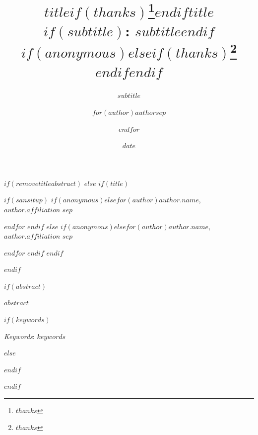 \documentclass[
$if(fontsize)$
  $fontsize$,
$endif$
$if(lang)$
  $babel-lang$,
$endif$
$if(papersize)$
  $papersize$paper,
$endif$
$if(beamer)$
  ignorenonframetext,
$if(handout)$
  handout,
$endif$
$if(aspectratio)$
  aspectratio=$aspectratio$,
$endif$
$endif$
$for(classoption)$
  $classoption$$sep$,
$endfor$
]{$documentclass$}
\title{$title$$if(thanks)$\thanks{$thanks$}$endif$}
\subtitle{$subtitle$}
\author{$for(author)$$author$$sep$ \and $endfor$}
\date{$date$}
\institute{$for(institute)$$institute$$sep$ \and $endfor$}
\title{$title$$if(subtitle)$: $subtitle$$endif$$if(anonymous)$$else$$if(thanks)$\thanks{$thanks$} $endif$$endif$ }
\date{}
\renewenvironment{abstract}
 {{%
    \setlength{\leftmargin}{0mm}
    \setlength{\rightmargin}{\leftmargin}%
  }%
  \relax}
 {\endlist}
\begin{document}


$if(removetitleabstract)$
$else$
$if(title)$

{%
\setlength{\parindent}{0pt}
\thispagestyle{plain}
{%
\maketitle  %

}




{
   \vskip 13.5pt\relax \normalsize\fontsize{11}{12}
   $if(sansitup)$
$if(anonymous)$\hfill $else$$for(author)$\MakeUppercase{\textsf{\large $author.name$}}, \small{$author.affiliation$}  $sep$ \par $endfor$ $endif$
$else$
$if(anonymous)$\hfill $else$$for(author)$\MakeUppercase{$author.name$}, \small{$author.affiliation$}  $sep$ \par \vskip -3.5pt $endfor$ $endif$
$endif$

}

}


$endif$



$if(abstract)$



\begin{abstract}


    \vskip 8.5pt %

\noindent \small{$abstract$}

$if(keywords)$

\vskip 8.5pt \noindent \emph{Keywords}: $keywords$ \par



$else$


$endif$

\end{abstract}

$endif$

\vskip -8.5pt
\end{document}
